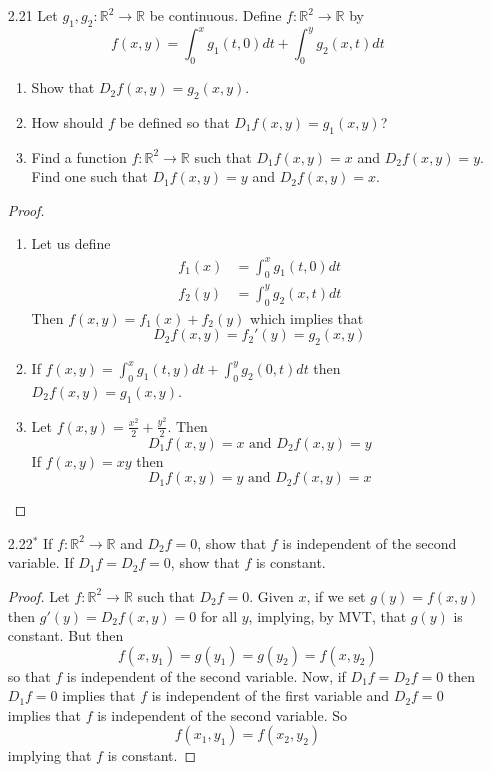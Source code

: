 \begin{enumerate}
    \item[2.21] Let \( g_1,g_2:\mathbb{R}^2 \rightarrow \mathbb{R} \) be continuous. Define \( f: \mathbb{R}^2 \rightarrow \mathbb{R} \) by
    \[
    f(x,y) = \int_0^x g_1(t,0)dt + \int_0^yg_2(x,t)dt
    \]
    \begin{enumerate}
        \item Show that \( D_2f(x,y) = g_2(x,y) \).
        \item How should \( f \) be defined so that \( D_1f(x,y) = g_1(x,y) \)?
        \item Find a function \( f:\mathbb{R}^2 \rightarrow \mathbb{R} \) such that \( D_1f(x,y) = x \) and \( D_2f(x,y) = y \). Find one such that \( D_1f(x,y) = y \) and \( D_2f(x,y) = x \).
    \end{enumerate}
    \begin{proof}
    \begin{enumerate}
        \item Let us define
        \begin{align*}
            f_1(x) &= \int_0^x g_1(t,0)dt \\
            f_{2}(y) &= \int_0^yg_2(x,t)dt
        \end{align*}
        Then \( f(x,y) = f_1(x) + f_2(y) \) which implies that
        \[
        D_2f(x,y) = f_{2}'(y) = g_2(x,y)
        \]
        
        \item If \( f(x,y) = \int_0^x g_1(t,y)dt + \int_0^yg_2(0,t)dt \) then \( D_2f(x,y) = g_1(x,y) \).
        
        \item Let \( f(x,y) = \frac{x^2}{2} + \frac{y^2}{2} \). Then
        \[
        D_1 f(x,y) = x \text{ and } D_{2}f(x,y) = y
        \]
        If \( f(x,y) = xy \) then 
        \[
        D_1f(x,y) = y \text{ and } D_2f(x,y) = x
        \]
    \end{enumerate}
    \end{proof}
    
    \item[2.22\(^*\)] If \( f: \mathbb{R}^2 \rightarrow \mathbb{R} \) and \( D_2f = 0 \), show that \( f \) is independent of the second variable. If \( D_1f=D_2f=0 \), show that \( f \) is constant.
    
    \begin{proof}
    Let \( f: \mathbb{R}^2 \rightarrow \mathbb{R} \) such that \( D_2f = 0 \). Given \( x \), if we set \( g(y) = f(x,y) \) then \( g'(y) = D_2f(x,y) = 0 \) for all \( y \), implying, by MVT, that \( g(y) \) is constant. But then 
    \[
    f(x,y_1) = g(y_1) = g(y_2) = f(x,y_2)
    \]
    so that \( f \) is independent of the second variable. Now, if \( D_1f = D_2f = 0 \) then \(D_1f = 0 \) implies that \( f \) is independent of the first variable and \( D_2f = 0 \) implies that \( f \) is independent of the second variable. So
    \[
    f(x_1,y_1) = f(x_2,y_2)
    \]
    implying that \( f \) is constant.
    \end{proof}


\end{enumerate}
